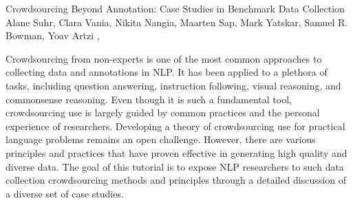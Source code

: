 \begin{tutorial}
  {Crowdsourcing Beyond Annotation: Case Studies in Benchmark Data Collection}
  {Alane Suhr, Clara Vania, Nikita Nangia, Maarten Sap, Mark Yatskar, Samuel R. Bowman, Yoav Artzi}
  {\daydateyear, \tutorialmorningtime}


Crowdsourcing from non-experts is one of the most common approaches to collecting data and annotations in NLP. It has been applied to a plethora of tasks, including question answering, instruction following, visual reasoning, and commonsense reasoning. Even though it is such a fundamental tool, crowdsourcing use is largely guided by common practices and the personal experience of researchers. Developing a theory of crowdsourcing use for practical language problems remains an open challenge. However, there are various principles and practices that have proven effective in generating high quality and diverse data. The goal of this tutorial is to expose NLP researchers to such data collection crowdsourcing methods and principles through a detailed discussion of a diverse set of case studies.

\end{tutorial}